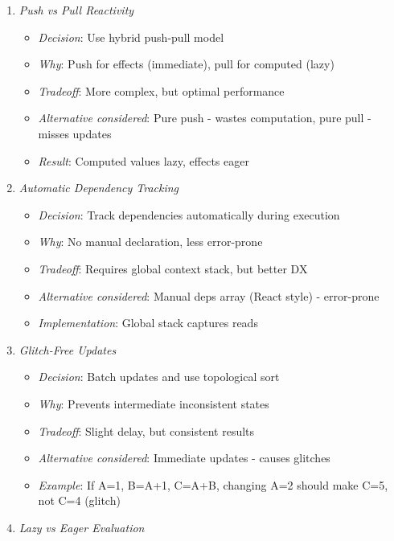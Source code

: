 \documentclass[11pt]{article}
\begin{document}
\begin{enumerate}
\item \emph{Push vs Pull Reactivity}

\begin{itemize}
\item \emph{Decision}: Use hybrid push-pull model
\item \emph{Why}: Push for effects (immediate), pull for computed (lazy)
\item \emph{Tradeoff}: More complex, but optimal performance
\item \emph{Alternative considered}: Pure push - wastes computation, pure pull - misses updates
\item \emph{Result}: Computed values lazy, effects eager
\end{itemize}

\item \emph{Automatic Dependency Tracking}

\begin{itemize}
\item \emph{Decision}: Track dependencies automatically during execution
\item \emph{Why}: No manual declaration, less error-prone
\item \emph{Tradeoff}: Requires global context stack, but better DX
\item \emph{Alternative considered}: Manual deps array (React style) - error-prone
\item \emph{Implementation}: Global stack captures reads
\end{itemize}

\item \emph{Glitch-Free Updates}

\begin{itemize}
\item \emph{Decision}: Batch updates and use topological sort
\item \emph{Why}: Prevents intermediate inconsistent states
\item \emph{Tradeoff}: Slight delay, but consistent results
\item \emph{Alternative considered}: Immediate updates - causes glitches
\item \emph{Example}: If A=1, B=A+1, C=A+B, changing A=2 should make C=5, not C=4 (glitch)
\end{itemize}

\item \emph{Lazy vs Eager Evaluation}


\end{enumerate}
\end{document}
